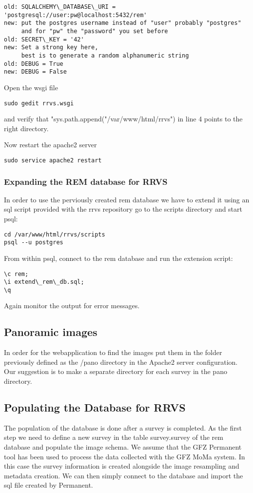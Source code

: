 \documentclass{article}
\begin{document}
\begin{verbatim}
old: SQLALCHEMY\_DATABASE\_URI = 'postgresql://user:pw@localhost:5432/rem'
new: put the postgres username instead of "user" probably "postgres" 
     and for "pw" the "password" you set before
old: SECRET\_KEY = '42'
new: Set a strong key here, 
     best is to generate a random alphanumeric string
old: DEBUG = True
new: DEBUG = False

\end{verbatim}

Open the wsgi file
\begin{verbatim}
sudo gedit rrvs.wsgi
\end{verbatim}
 
and verify that "sys.path.append("/var/www/html/rrvs") in line 4 points to the right directory.

Now restart the apache2 server 
\begin{verbatim}
sudo service apache2 restart
\end{verbatim}

\subsubsection{Expanding the REM database for RRVS}
In order to use the perviously created rem database we have to extend
it using an sql script provided with the rrvs repository
go to the scripts directory and start psql:
\begin{verbatim}
cd /var/www/html/rrvs/scripts
psql --u postgres
\end{verbatim}
From within psql, connect to the rem database and run the extension
script:
\begin{verbatim}
\c rem;
\i extend\_rem\_db.sql;
\q
\end{verbatim}
Again monitor the output for error messages.

\subsection{Panoramic images}
In order for the webapplication to find the images put them
in the folder previously defined as the /pano directory in the 
Apache2 server configuration. Our suggestion is to make a 
separate directory for each survey in the pano directory. 

\subsection{Populating the Database for RRVS}
The population of the database is done after a survey is completed.
As the first step we need to define a new survey in the table 
survey.survey of the rem database and populate the image schema. 
We assume that the GFZ Permanent tool has been used to process the 
data collected with the GFZ MoMa system. In this case the survey 
information is created alongside the image resampling and metadata 
creation. We can then simply connect to the database and import
the sql file created by Permanent.
\end{document}
